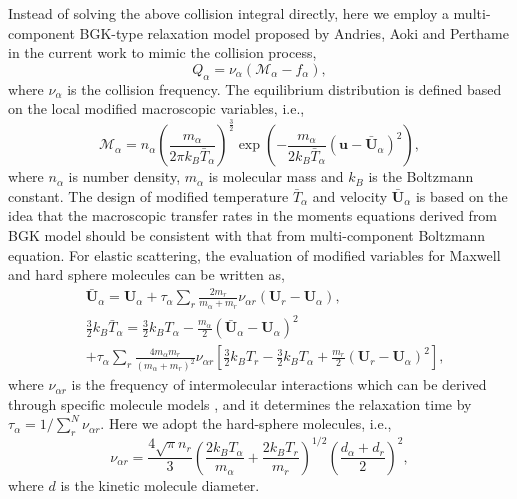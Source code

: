 \documentclass[preprint,3p,12pt,sort&compress]{elsarticle}
\begin{document}
Instead of solving the above collision integral directly, here we employ a multi-component BGK-type relaxation model proposed by Andries, Aoki and Perthame \cite{andries2002consistent} in the current work to mimic the collision process, 
\begin{equation}
Q_\alpha = \nu_\alpha ( \mathcal M_\alpha-f_\alpha ),
\label{eqn:aap}
\end{equation}
where $\nu_{\alpha}$ is the collision frequency.
The equilibrium distribution is defined based on the local modified macroscopic variables, i.e.,
\begin{equation}
\mathcal M_\alpha=n_\alpha\left(\frac{m_\alpha}{2\pi k_B \bar T_\alpha}\right)^\frac{3}{2}\exp \left(-\frac{m_\alpha}{2k_B \bar T_\alpha}(\mathbf u -\mathbf {\bar U}_\alpha)^2\right),
\label{eqn:maxwellian}
\end{equation}
where $n_\alpha$ is number density, $m_\alpha$ is molecular mass and $k_B$ is the Boltzmann constant.
The design of modified temperature $\bar T_\alpha$ and velocity $\mathbf {\bar U}_\alpha$ is based on the idea that the macroscopic transfer rates in the moments equations derived from BGK model should be consistent with that from multi-component Boltzmann equation.
For elastic scattering, the evaluation of modified variables for Maxwell and hard sphere molecules can be written as,
\begin{equation}
\begin{aligned}
&\mathbf {\bar{U}}_\alpha=\mathbf U_\alpha+\tau_\alpha\sum_{r}\frac{2 m_r}{m_\alpha+m_r}\nu_{\alpha r}(\mathbf U_r-\mathbf U_\alpha), \\
&\frac{3}{2}k_B \bar T_\alpha=\frac{3}{2}k_BT_\alpha-\frac{m_\alpha}{2}(\mathbf {\bar U}_\alpha-\mathbf U_\alpha)^2\\
&+\tau_\alpha\sum_{r}\frac{4 m_\alpha m_r}{(m_\alpha+m_r)^2}\nu_{\alpha r}\left[ \frac{3}{2}k_BT_r-\frac{3}{2}k_BT_\alpha+\frac{m_r}{2}(\mathbf U_r-\mathbf U_\alpha)^2 \right],
\label{eqn:modified variable}
\end{aligned}
\end{equation}
where $\nu_{\alpha r}$ is the frequency of intermolecular interactions which can be derived through specific molecule models \cite{morse1963energy}, and it determines the relaxation time by $\tau_\alpha=1/\sum_r^N \nu_{\alpha r}$.
Here we adopt the hard-sphere molecules, i.e.,
\begin{equation}
\nu_{\alpha r}=\frac{4 \sqrt{\pi} n_r}{3}\left(\frac{2 k_{B} T_{\alpha}}{m_{\alpha}}+\frac{2 k_{B} T_{r}}{m_{r}}\right)^{1 / 2}\left(\frac{d_{\alpha}+d_{r}}{2}\right)^{2},
\label{eqn:collision frequency}
\end{equation}
where $d$ is the kinetic molecule diameter.
\end{document}

